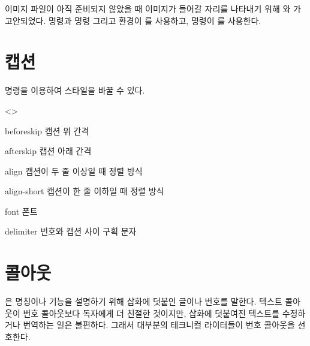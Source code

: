 \documentclass[minted]{hzguide}
\begin{document}
\begin{code}
\fakeimage[text]
\fakeimg[text]
\end{code}

이미지 파일이 아직 준비되지 않았을 때 이미지가 들어갈 자리를 나타내기 위해 \macro{\fakeimage}와 \macro{\fakeimg}가 고안되었다.
\macro{\image} 명령과 \macro{\listimg*} 명령 그리고  환경이 \macro{\fakeimage}를 사용하고, \macro{\img*} 명령이 \macro{\fakeimg}를 사용한다.

\begin{coderesult}
\end{coderesult}

\section{캡션}

\macro{\CaptionSetup} 명령을 이용하여  스타일을 바꿀 수 있다.

\begin{code}
\end{code}

\begin{macros}<\CaptionSetup>
\item[beforeskip] \keyvalue{1ex}
캡션 위 간격

\item[afterskip] \keyvalue{1ex}
캡션 아래 간격
\item[align] \keyvalue{\raggedright, \centering}
캡션이 두 줄 이상일 때 정렬 방식

\item[align-short] \keyvalue{\centering}
캡션이 한 줄 이하일 때 정렬 방식

\item[font] \keyvalue{\beseries\small}
폰트

\item[delimiter] \keyvalue{:}
번호와 캡션 사이 구획 문자
\end{macros}

\section{콜아웃}

은 명칭이나 기능을 설명하기 위해 삽화에 덧붙인 글이나 번호를 말한다.
텍스트 콜아웃이 번호 콜아웃보다 독자에게 더 친절한 것이지만, 삽화에 덧붙여진 텍스트를 수정하거나 번역하는 일은 불편하다.
그래서 대부분의 테크니컬 라이터들이 번호 콜아웃을 선호한다.
\end{document}
